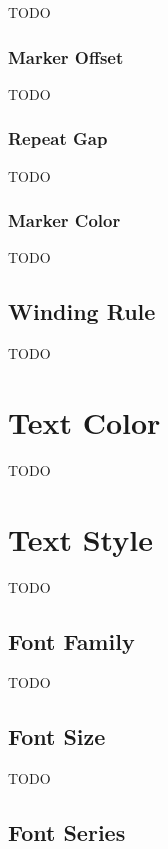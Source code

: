 TODO


\subsubsection{Marker Offset}\label{sec:markeroffset}

TODO


\subsubsection{Repeat Gap}\label{sec:repeatgap}

TODO


\subsubsection{Marker Color}\label{sec:markerpaint}

TODO


\subsection{Winding Rule}\label{sec:winding}

TODO


\section{Text Color}\label{sec:textpaint}

TODO


\section{Text Style}\label{sec:textstyle}

TODO


\subsection{Font Family}\label{sec:fontfamily}

TODO


\subsection{Font Size}\label{sec:fontsize}

TODO


\subsection{Font Series}\label{sec:fontseries}

